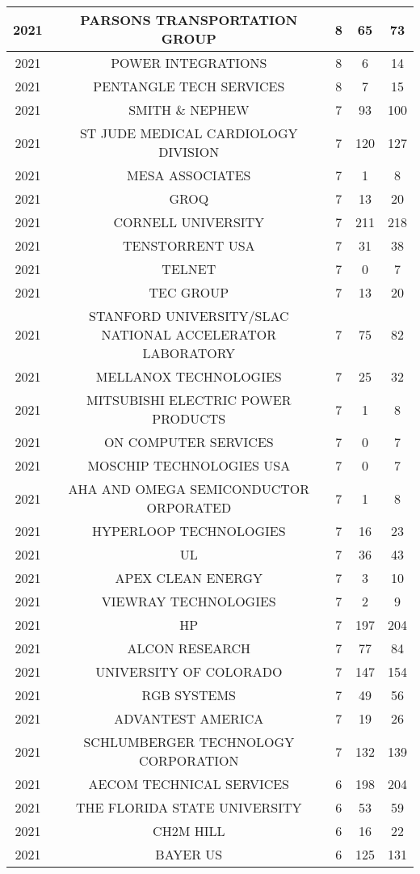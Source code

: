 \documentclass{article}%
\begin{document}
\begin{longtable}{c|c|c|c|c}
\hline%
2021&PARSONS TRANSPORTATION GROUP&8&65&73\\%
\hline%
2021&POWER INTEGRATIONS&8&6&14\\%
\hline%
2021&PENTANGLE TECH SERVICES&8&7&15\\%
\hline%
2021&SMITH \& NEPHEW&7&93&100\\%
\hline%
2021&ST JUDE MEDICAL CARDIOLOGY DIVISION&7&120&127\\%
\hline%
2021&MESA ASSOCIATES&7&1&8\\%
\hline%
2021&GROQ&7&13&20\\%
\hline%
2021&CORNELL UNIVERSITY&7&211&218\\%
\hline%
2021&TENSTORRENT USA&7&31&38\\%
\hline%
2021&TELNET&7&0&7\\%
\hline%
2021&TEC GROUP&7&13&20\\%
\hline%
2021&STANFORD UNIVERSITY/SLAC NATIONAL ACCELERATOR LABORATORY&7&75&82\\%
\hline%
2021&MELLANOX TECHNOLOGIES&7&25&32\\%
\hline%
2021&MITSUBISHI ELECTRIC POWER PRODUCTS&7&1&8\\%
\hline%
2021&ON COMPUTER SERVICES&7&0&7\\%
\hline%
2021&MOSCHIP TECHNOLOGIES USA&7&0&7\\%
\hline%
2021&AHA AND OMEGA SEMICONDUCTOR ORPORATED&7&1&8\\%
\hline%
2021&HYPERLOOP TECHNOLOGIES&7&16&23\\%
\hline%
2021&UL&7&36&43\\%
\hline%
2021&APEX CLEAN ENERGY&7&3&10\\%
\hline%
2021&VIEWRAY TECHNOLOGIES&7&2&9\\%
\hline%
2021&HP&7&197&204\\%
\hline%
2021&ALCON RESEARCH&7&77&84\\%
\hline%
2021&UNIVERSITY OF COLORADO&7&147&154\\%
\hline%
2021&RGB SYSTEMS&7&49&56\\%
\hline%
2021&ADVANTEST AMERICA&7&19&26\\%
\hline%
2021&SCHLUMBERGER TECHNOLOGY CORPORATION&7&132&139\\%
\hline%
2021&AECOM TECHNICAL SERVICES&6&198&204\\%
\hline%
2021&THE FLORIDA STATE UNIVERSITY&6&53&59\\%
\hline%
2021&CH2M HILL&6&16&22\\%
\hline%
2021&BAYER US&6&125&131\\%

\end{longtable}
\end{document}
